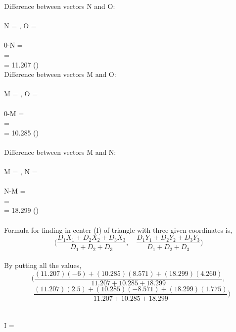 \documentclass[journal,12pt,twocolumn]{IEEEtran}
\begin{document}
Difference between vectors N and O:\\
\\
N = , O = \\
\\
0-N = \\
 = \\
 = 11.207 \qquad\qquad ()\\

Difference between vectors M and O:\\
\\
M = , O = \\
\\
0-M = \\
 = \\
 = 10.285 \qquad\qquad ()\\
\\

Difference between vectors M and N:\\
\\
M = , N = \\
\\
N-M = \\
 = \\
 = 18.299 \qquad\qquad ()\\
\\

Formula for finding in-center (I) of triangle with three given coordinates is,\\
$$ \bigg(\frac{D_1X_1 + D_2X_2 + D_3X_3}{D_1+D_2+D_3} ,\quad\frac{D_1Y_1 + D_2Y_2 + D_3Y_3}{D_1+D_2+D_3}\bigg) $$
\\
By putting all the values,\\
$$ \bigg(\frac{(11.207)(-6) + (10.285)(8.571) + (18.299)(4.260)}{11.207+10.285+18.299} ,$$
$$\quad\frac{(11.207)(2.5) + (10.285)(-8.571) + (18.299)(1.775)}{11.207+10.285+18.299}\bigg) $$
\\ \\
I = 
\end{document}
